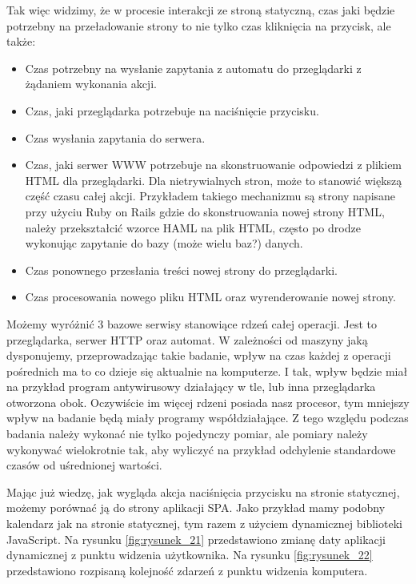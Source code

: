 Tak więc widzimy, że w procesie interakcji ze stroną statyczną, czas jaki będzie potrzebny na przeładowanie strony to nie tylko czas kliknięcia na przycisk, ale także:
\begin{itemize}
    \item Czas potrzebny na wysłanie zapytania z automatu do przeglądarki z żądaniem wykonania akcji.
    \item Czas, jaki przeglądarka potrzebuje na naciśnięcie przycisku.
    \item Czas wysłania zapytania do serwera.
    \item Czas, jaki serwer WWW potrzebuje na skonstruowanie odpowiedzi z plikiem HTML dla przeglądarki. Dla nietrywialnych stron, może to stanowić większą część czasu całej akcji.
    Przykładem takiego mechanizmu są strony napisane przy użyciu Ruby on Rails gdzie do skonstruowania nowej strony HTML,
    należy przekształcić wzorce HAML \cite{ruby} na plik HTML, często po drodze wykonując zapytanie do bazy (może wielu baz?) danych.
    \item Czas ponownego przesłania treści nowej strony do przeglądarki.
    \item Czas procesowania nowego pliku HTML oraz wyrenderowanie nowej strony.    
\end{itemize}

Możemy wyróżnić 3 bazowe serwisy stanowiące rdzeń całej operacji.
Jest to przeglądarka, serwer HTTP oraz automat.
W zależności od maszyny jaką dysponujemy, przeprowadzając takie badanie, wpływ na czas każdej z operacji pośrednich ma to co dzieje się aktualnie na komputerze.
I tak, wpływ będzie miał na przykład program antywirusowy działający w tle, lub inna przeglądarka otworzona obok.
Oczywiście im więcej rdzeni \cite{threads} posiada nasz procesor, tym mniejszy wpływ na badanie będą miały programy współdziałające.
Z tego względu podczas badania należy wykonać nie tylko pojedynczy pomiar, ale pomiary należy wykonywać wielokrotnie tak, aby wyliczyć na przykład
odchylenie standardowe czasów od uśrednionej wartości.

Mając już wiedzę, jak wygląda akcja naciśnięcia przycisku na stronie statycznej, możemy porównać ją do strony aplikacji SPA.
Jako przykład mamy podobny kalendarz jak na stronie statycznej, tym razem z użyciem dynamicznej biblioteki JavaScript.
Na rysunku \ref{fig:rysunek_21} przedstawiono zmianę daty aplikacji dynamicznej z punktu widzenia użytkownika.
Na rysunku \ref{fig:rysunek_22} przedstawiono rozpisaną kolejność zdarzeń z punktu widzenia komputera.

